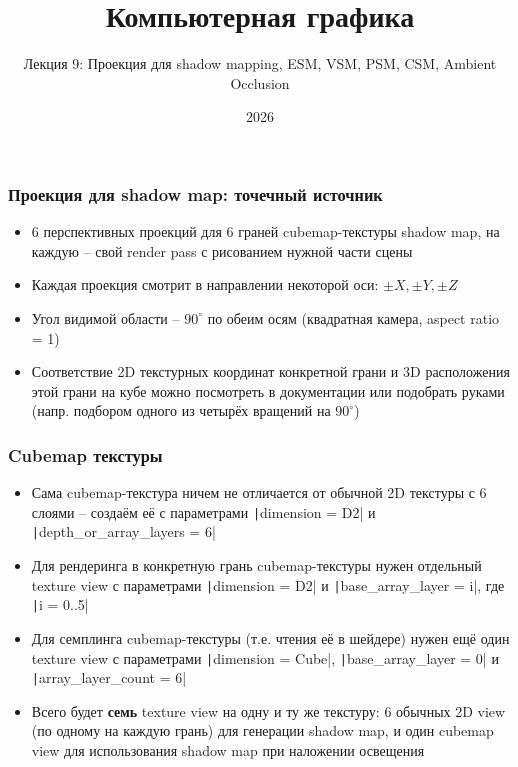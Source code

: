 \documentclass[10pt]{beamer}
\title{Компьютерная графика}
\subtitle{Лекция 9: Проекция для shadow mapping, ESM, VSM, PSM, CSM, Ambient Occlusion}
\date{2026}
\begin{document}
\frame{\titlepage}

\begin{frame}[fragile]
\frametitle{Проекция для shadow map: точечный источник}
\begin{itemize}
\item 6 перспективных проекций для 6 граней cubemap-текстуры shadow map, на каждую -- свой render pass с рисованием нужной части сцены
\pause
\item Каждая проекция смотрит в направлении некоторой оси: \begin{math}\pm X, \pm Y, \pm Z\end{math}
\pause
\item Угол видимой области -- \begin{math}90^\circ\end{math} по обеим осям (квадратная камера, aspect ratio = 1)
\pause
\item Соответствие 2D текстурных координат конкретной грани и 3D расположения этой грани на кубе можно посмотреть в документации или подобрать руками (напр. подбором одного из четырёх вращений на \begin{math}90^\circ\end{math})
\end{itemize}
\end{frame}

\begin{frame}[fragile]
\frametitle{Cubemap текстуры}
\begin{itemize}
\item Сама cubemap-текстура ничем не отличается от обычной 2D текстуры с 6 слоями -- создаём её с параметрами \texttt|dimension = D2| и \texttt|depth_or_array_layers = 6|
\pause
\item Для рендеринга в конкретную грань cubemap-текстуры нужен отдельный texture view с параметрами \texttt|dimension = D2| и \texttt|base_array_layer = i|, где \texttt|i = 0..5|
\pause
\item Для семплинга cubemap-текстуры (т.е. чтения её в шейдере) нужен ещё один texture view с параметрами \texttt|dimension = Cube|, \texttt|base_array_layer = 0| и \texttt|array_layer_count = 6|
\pause
\item Всего будет \textbf{семь} texture view на одну и ту же текстуру: 6 обычных 2D view (по одному на каждую грань) для генерации shadow map, и один cubemap view для использования shadow map при наложении освещения
\end{itemize}
\end{frame}
\end{document}

